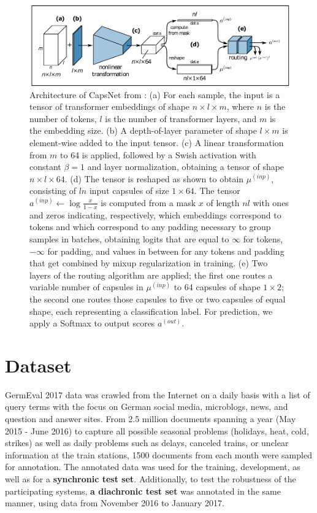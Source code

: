 \documentclass{article}
\begin{document}
\begin{figure}[!tbh]
    \centering
    \includegraphics[width=0.9\linewidth]{architecture}
    \caption{Architecture of CapsNet from \cite{heinsen2019algorithm}: (a) For each sample, the input is a tensor of transformer embeddings of
shape $n \times l \times m$, where $n$ is the number of tokens, $l$ is the number of transformer layers, and $m$ is the
embedding size. (b) A depth-of-layer parameter of shape $l \times m$ is element-wise added to the input tensor.
(c) A linear transformation from $m$ to 64 is applied, followed by a Swish activation with constant $\beta = 1$
and layer normalization, obtaining a tensor of shape $n \times l \times 64$. (d) The tensor is reshaped as shown to
obtain $\mu^{(inp)}$, consisting of $ln$ input capsules of size $1\times 64$. The tensor $a^{(inp)} \leftarrow \log \frac{x}{1-x}$ is computed from a mask
$x$ of length $nl$ with ones and zeros indicating, respectively, which embeddings correspond to tokens and
which correspond to any padding necessary to group samples in batches, obtaining logits that are equal
to $\infty$ for tokens, $-\infty$ for padding, and values in between for any tokens and padding that get combined
by mixup regularization in training. (e) Two layers of the routing algorithm are applied; the first one routes
a variable number of capsules in $\mu^{(inp)}$
to 64 capsules of shape $1\times 2$; the second one routes those capsules
to five or two capsules of equal shape, each representing a classification label.
For prediction, we apply a Softmax to output scores $a^{(out)}$.}
    \label{fig:arch}
\end{figure}

\section{Dataset}
GermEval 2017 data was crawled from the Internet on a daily
basis with a list of query terms with the focus on German social media,
microblogs, news, and question and answer sites. From 2.5 million documents spanning a year (May 2015 - June 2016) to capture all possible seasonal problems (holidays, heat, cold, strikes) as well as daily problems such as
delays, canceled trains, or unclear information at the train stations, 1500 documents from each month were sampled for annotation. The annotated data was used for the training,
development, as well as for a {\bf synchronic test set}.
Additionally, to test the robustness of the participating systems, {\bf a diachronic test
set}  was annotated in
the same manner, using data from November 2016
to January 2017.
\end{document}
